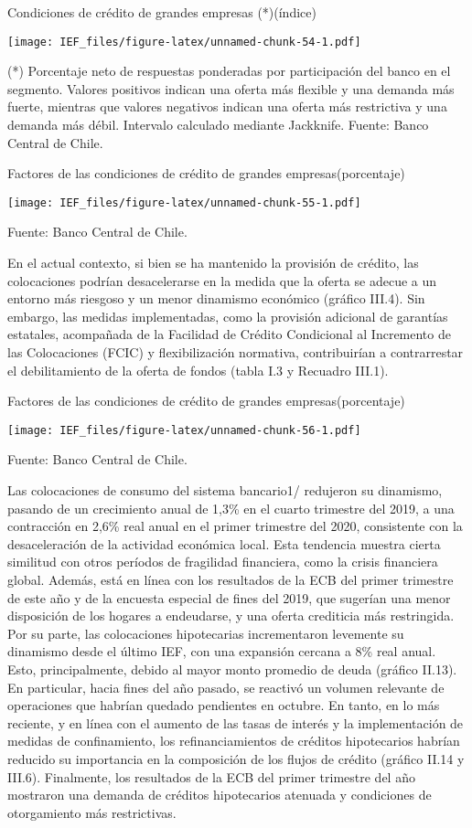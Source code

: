 \documentclass[
]{book}
\begin{document}
Condiciones de crédito de grandes empresas (*)(índice)

\texttt{[image: IEF\_files/figure-latex/unnamed-chunk-54-1.pdf]}

(*) Porcentaje neto de respuestas ponderadas por participación del banco en el segmento. Valores positivos indican una oferta más flexible y una demanda más fuerte, mientras que valores negativos indican una oferta más restrictiva y una demanda más débil. Intervalo calculado mediante Jackknife.
Fuente: Banco Central de Chile.

Factores de las condiciones de crédito de grandes empresas(porcentaje)

\texttt{[image: IEF\_files/figure-latex/unnamed-chunk-55-1.pdf]}

Fuente: Banco Central de Chile.

En el actual contexto, si bien se ha mantenido la provisión de crédito, las
colocaciones podrían desacelerarse en la medida que la oferta se adecue a
un entorno más riesgoso y un menor dinamismo económico (gráfico III.4). Sin
embargo, las medidas implementadas, como la provisión adicional de garantías
estatales, acompañada de la Facilidad de Crédito Condicional al Incremento de
las Colocaciones (FCIC) y flexibilización normativa, contribuirían a contrarrestar
el debilitamiento de la oferta de fondos (tabla I.3 y Recuadro III.1).

Factores de las condiciones de crédito de grandes empresas(porcentaje)

\texttt{[image: IEF\_files/figure-latex/unnamed-chunk-56-1.pdf]}

Fuente: Banco Central de Chile.

Las colocaciones de consumo del sistema bancario1/ redujeron su dinamismo,
pasando de un crecimiento anual de 1,3\% en el cuarto trimestre del 2019, a una
contracción en 2,6\% real anual en el primer trimestre del 2020, consistente con
la desaceleración de la actividad económica local. Esta tendencia muestra cierta
similitud con otros períodos de fragilidad financiera, como la crisis financiera
global. Además, está en línea con los resultados de la ECB del primer trimestre
de este año y de la encuesta especial de fines del 2019, que sugerían una menor
disposición de los hogares a endeudarse, y una oferta crediticia más restringida.
Por su parte, las colocaciones hipotecarias incrementaron levemente su
dinamismo desde el último IEF, con una expansión cercana a 8\% real anual.
Esto, principalmente, debido al mayor monto promedio de deuda (gráfico II.13).
En particular, hacia fines del año pasado, se reactivó un volumen relevante de
operaciones que habrían quedado pendientes en octubre. En tanto, en lo más
reciente, y en línea con el aumento de las tasas de interés y la implementación
de medidas de confinamiento, los refinanciamientos de créditos hipotecarios
habrían reducido su importancia en la composición de los flujos de crédito
(gráfico II.14 y III.6). Finalmente, los resultados de la ECB del primer trimestre del
año mostraron una demanda de créditos hipotecarios atenuada y condiciones
de otorgamiento más restrictivas.
\end{document}
